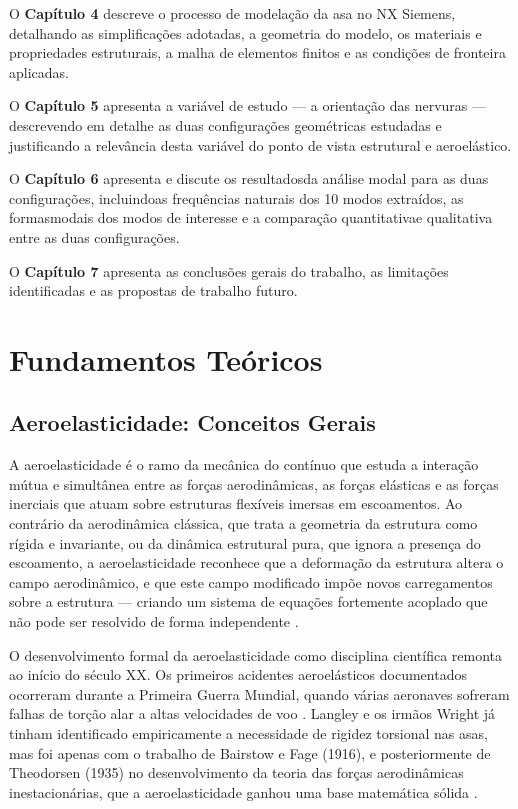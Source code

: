 \documentclass[a4paper,fleqn,noprintline]{cas-dc}
\begin{document}
O \textbf{Capítulo 4} descreve o processo de modelação da asa no NX Siemens, detalhando as simplificações adotadas, a geometria do modelo, os materiais e propriedades estruturais, a malha de elementos finitos e as condições de fronteira aplicadas.

O \textbf{Capítulo 5} apresenta a variável de estudo --- a orientação das nervuras --- descrevendo em detalhe as duas configurações geométricas estudadas e justificando a relevância desta variável do ponto de vista estrutural e aeroelástico.

O \textbf{Capítulo 6} apresenta e discute os resultadosda análise modal para as duas configurações, incluindoas frequências naturais dos 10 modos extraídos, as formasmodais dos modos de interesse e a comparação quantitativae qualitativa entre as duas configurações.

O \textbf{Capítulo 7} apresenta as conclusões gerais do trabalho, as limitações identificadas e as propostas de trabalho futuro.

\section{Fundamentos Teóricos}

\subsection{Aeroelasticidade: Conceitos Gerais}

A aeroelasticidade é o ramo da mecânica do contínuo que estuda a interação mútua e simultânea entre as forças aerodinâmicas, as forças elásticas e as forças inerciais que atuam sobre estruturas flexíveis imersas em escoamentos. Ao contrário da aerodinâmica clássica, que trata a geometria da estrutura como rígida e invariante, ou da dinâmica estrutural pura, que ignora a presença do escoamento, a aeroelasticidade reconhece que a deformação da estrutura altera o campo aerodinâmico, e que este campo modificado impõe novos carregamentos sobre a estrutura --- criando um sistema de equações fortemente acoplado que não pode ser resolvido de forma independente \cite{Bisplinghoff1996, Dowell2004}.

O desenvolvimento formal da aeroelasticidade como disciplina científica remonta ao início do século XX. Os primeiros acidentes aeroelásticos documentados ocorreram durante a Primeira Guerra Mundial, quando várias aeronaves sofreram falhas de torção alar a altas velocidades de voo \cite{Collar1946}. Langley e os irmãos Wright já tinham identificado empiricamente a necessidade de rigidez torsional nas asas, mas foi apenas com o trabalho de Bairstow e Fage (1916), e posteriormente de Theodorsen (1935) no desenvolvimento da teoria das forças aerodinâmicas inestacionárias, que a aeroelasticidade ganhou uma base matemática sólida \cite{Fung1993, Theodorsen1935}.
\end{document}
